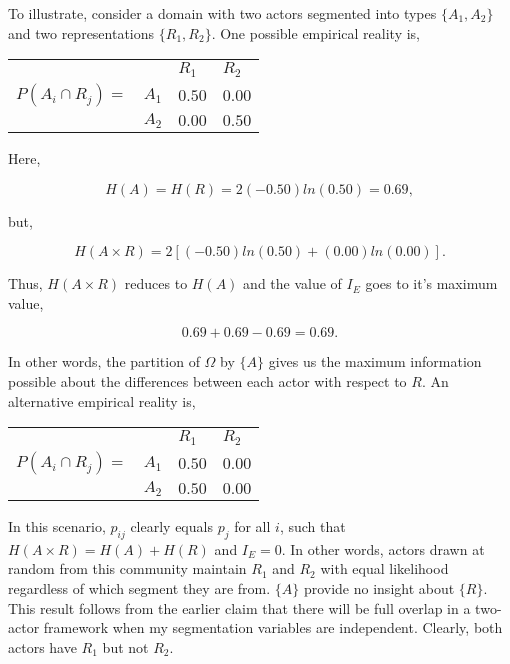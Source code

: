 To illustrate, consider a domain with two actors segmented into types $\{A_1, A_2\}$ and two representations $\{R_1, R_2\}$.  One possible empirical reality is,

\begin{center}
\begin{tabular}{ l l l l}
& & $R_1$ & $R_2$ \\
$P(A_i \cap R_j)=$ & $A_1$ & $0.50$ & $0.00$ \\
 & $A_2$ & $0.00$ & $0.50$
\end{tabular}
\end{center}

\noindent Here, 

\begin{equation}
\nonumber H(A) = H(R) = 2(-0.50)ln(0.50) = 0.69,
\end{equation}

\noindent but,

\begin{equation}
\nonumber H(A \times R) = 2[(-0.50)ln(0.50) + (0.00)ln(0.00)].
\end{equation}

Thus, $H(A \times R)$ reduces to $H(A)$ and the value of $I_E$ goes to it's maximum value,

\begin{equation}
\nonumber 0.69 + 0.69 - 0.69 = 0.69.
\end{equation}

In other words, the partition of $\Omega$ by $\{A\}$ gives us the maximum information possible about the differences between each actor with respect to $R$. An alternative empirical reality is, 

\begin{center}
\begin{tabular}{ l l l l}
& & $R_1$ & $R_2$ \\
$P(A_i \cap R_j)=$ & $A_1$ & $0.50$ & $0.00$ \\
 & $A_2$ & $0.50$ & $0.00$
\end{tabular}
\end{center}

In this scenario, $p_{ij}$ clearly equals $p_j$ for all $i$, such that $H(A \times R) = H(A) + H(R)$ and $I_E = 0$. In other words, actors drawn at random from this community maintain $R_1$ and $R_2$ with equal likelihood regardless of which segment they are from. $\{A\}$ provide no insight about $\{R\}$. This result follows from the earlier claim that there will be full overlap in a two-actor framework when my segmentation variables are independent. Clearly, both actors have $R_1$ but not $R_2$.
 
